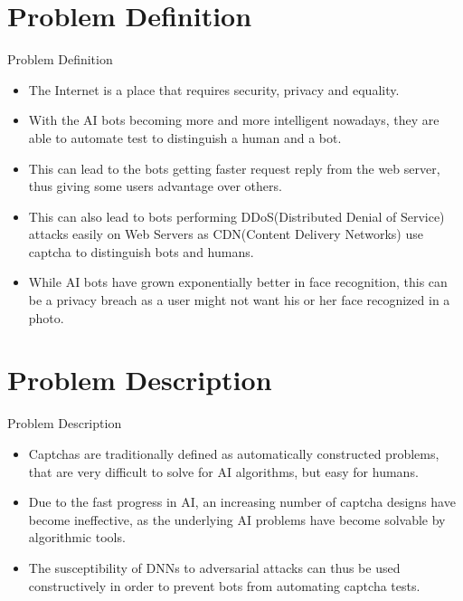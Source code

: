 \documentclass[10pt]{beamer}
\begin{document}
\section{Problem Definition}
\begin{frame}{Problem Definition}
    \begin{itemize}   
    \item The Internet is a place that requires security, privacy and equality.\\\bigskip
    \item With the AI bots becoming more and more intelligent nowadays, they are able to automate test to distinguish a human and a bot. 
    \item This can lead to the bots getting faster request reply from the web server, thus giving some users advantage over others.
    \item This can also lead to bots performing DDoS(Distributed Denial of Service) attacks easily on Web Servers as CDN(Content Delivery Networks) use captcha to distinguish bots and humans.\\\bigskip
    
    \item While AI bots have grown exponentially better in face recognition, this can be a privacy breach as a user might not want his or her face recognized in a photo.
    
    \end{itemize}
\end{frame}


\section{Problem Description}
\begin{frame}{Problem Description}
\begin{itemize}
    \item Captchas are traditionally defined as
automatically constructed problems, that are very difficult
to solve for AI algorithms, but easy for humans.
\item  Due to the
fast progress in AI, an increasing number of captcha
designs have become ineffective, as the underlying AI
problems have become solvable by algorithmic tools.
\item The susceptibility of DNNs to adversarial attacks can thus be used constructively in order to prevent bots from automating captcha tests.
\end{itemize}

\end{frame}
\end{document}
